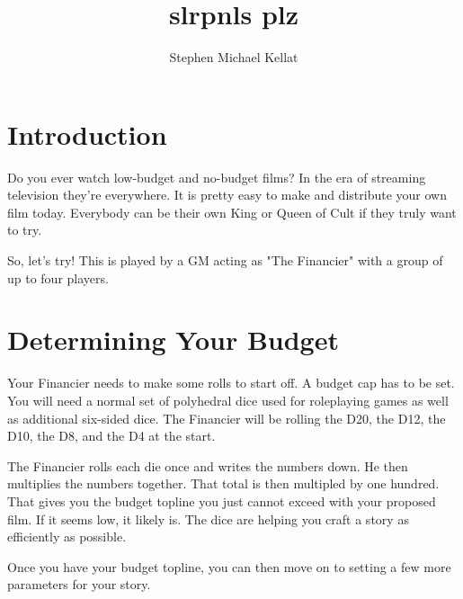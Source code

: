 \documentclass[
notumble,
a5paper
]{leaflet}
\title{slrpnls plz}
\author{Stephen Michael Kellat}
\date{}
\begin{document}
\maketitle

\maketitle

\begin{center}
\begin{Large}    \end{Large}
\end{center}

\section*{Introduction}

Do you ever watch low-budget and no-budget films?  In the era of streaming television they're everywhere.  It is pretty easy to make and distribute your own film today.  Everybody can be their own King or Queen of Cult if they truly want to try.

So, let's try!  This is played by a GM acting as "The Financier" with a group of up to four players.
\cleardoublepage
\section*{Determining Your Budget}

Your Financier needs to make some rolls to start off.  A budget cap has to be set.  You will need a normal set of polyhedral dice used for roleplaying games as well as additional six-sided dice.  The Financier will be rolling the D20, the D12, the D10, the D8, and the D4 at the start.

The Financier rolls each die once and writes the numbers down.  He then multiplies the numbers together.  That total is then multipled by one hundred.  That gives you the budget topline you just cannot exceed with your proposed film.  If it seems low, it likely is.  The dice are helping you craft a story as efficiently as possible.

Once you have your budget topline, you can then move on to setting a few more parameters for your story.

\begin{center}
\begin{Large} \faMoneyBill* \faMoneyBillWave \faMoneyCheck* \end{Large}
\end{center}
\cleardoublepage
\end{document}
